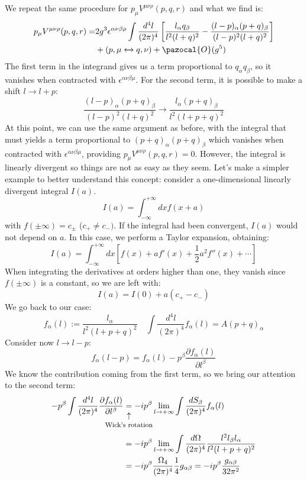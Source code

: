 \documentclass[../main.tex]{subfiles}
\begin{document}
We repeat the same procedure for $p_\mu V^{\mu\nu\rho}(p,q,r)$ and what we find is:
\begin{align*}
p_\mu V^{\mu\nu\rho}(p,q,r)=&2g^3\epsilon^{\alpha\nu\beta\rho}\int\frac{d^4l}{(2\pi)^4}\left[\frac{l_\alpha q_\beta}{l^2(l+q)^2}-\frac{(l-p)_\alpha(p+q)_\beta}{(l-p)^2(l+q)^2}\right]\\
&+(p,\mu\xleftrightarrow[]{}q,\nu)+\pazocal{O}(g^5)
\end{align*}
The first term in the integrand gives us a term proportional to $q_\alpha q_\beta$, so it vanishes when contracted with $\epsilon^{\alpha\nu\beta\mu}$. For the second term, it is possible to make a shift $l\to l+p$:
\[
\frac{(l-p)_\alpha(p+q)_\beta}{(l-p)^2(l+q)^2}\to\frac{l_\alpha(p+q)_\beta}{l^2(l+p+q)^2}
\]
At this point, we can use the same argument as before, with the integral that must yields a term proportional to $(p+q)_\alpha(p+q)_\beta$ which vanishes when contracted with $\epsilon^{\alpha\nu\beta\mu}$, providing $p_\mu V^{\mu\nu\rho}(p,q,r)=0$. However, the integral is linearly divergent so things are not as easy as they seem. Let's make a simpler example to better understand this concept: consider a one-dimensional linearly divergent integral $I(a)$.
\[
I(a)=\int_{-\infty}^{+\infty}dxf(x+a)
\]
with $f(\pm\infty)=c_\pm$ ($c_+\neq c_-)$. If the integral had been convergent, $I(a)$ would not depend on $a$. In this case, we perform a Taylor expansion, obtaining:
\[
I(a)=\int_{-\infty}^{+\infty}dx\left[f(x)+af'(x)+\frac{1}{2}a^2f''(x)+\cdots\right]
\]
When integrating the derivatives at orders higher than one, they vanish since $f(\pm\infty)$ is a constant, so we are left with:
\[
I(a)=I(0)+a(c_+-c_-)
\]
We go back to our case:
\[
f_\alpha(l):=\frac{l_\alpha}{l^2(l+p+q)^2} \quad \int\frac{d^4l}{(2\pi)^4}f_\alpha(l)=A(p+q)
_\alpha
\]
Consider now $l\to l-p$:
\[
f_\alpha(l-p)=f_\alpha(l)-p^\beta\frac{\partial f_\alpha(l)}{\partial l^\beta}
\]
We know the contribution coming from the first term, so we bring our attention to the second term:
\begin{align*}
-p^\beta\int\frac{d^4l}{(2\pi)^4}\frac{\partial f_\alpha(l)}{\partial l^\beta}&\underset{\mathclap{\tikz \node {$\uparrow$} node [below=1ex] {\footnotesize  Wick's rotation};}}{=}-ip^\beta\lim_{l\to+\infty}\int\frac{dS_\beta}{(2\pi)^4}f_\alpha(l)\\
&=-ip^\beta\lim_{l\to+\infty}\int\frac{d\Omega}{(2\pi)^4}\frac{l^2l_\beta l_\alpha}{l^2(l+p+q)^2}\\
&=-ip^\beta\frac{\Omega_4}{(2\pi)^4}\frac{1}{4}g_{\alpha\beta}=-ip^\beta\frac{g_{\alpha\beta}}{32\pi^2}
\end{align*}
\end{document}
